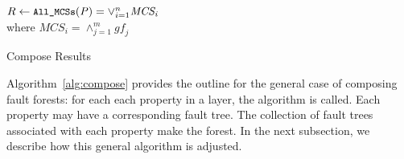 \begin{algorithm}[h]

	$R \gets \mathit{\texttt{\small{All\_MCSs}}(P)} = \lor_{i=1}^n \mathit{MCS_i}$\\
	where $\mathit{MCS_i} = \land_{j=1}^m \mathit{gf_j}$\\
	\caption{Compose Results}
	\label{alg:compose}
\end{algorithm}

Algorithm~\ref{alg:compose} provides the outline for the general case of composing fault forests: for each each property in a layer, the algorithm is called. Each property may have a corresponding fault tree. The collection of fault trees associated with each property make the forest. In the next subsection, we describe how this general algorithm is adjusted.

